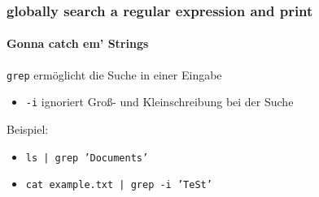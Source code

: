\documentclass[12pt,utf8]{beamer}
\begin{document}
\begin{frame}
	\frametitle{globally search a regular expression and print}
	\framesubtitle{Gonna catch em' Strings}
	\texttt{grep} ermöglicht die Suche in einer Eingabe
	\begin{itemize}
		\item \texttt{-i} ignoriert Groß- und Kleinschreibung bei der Suche
	\end{itemize}
	Beispiel:
	\begin{itemize}
		\item \texttt{ls | grep 'Documents'}
		\item \texttt{cat example.txt | grep -i 'TeSt'}
	\end{itemize}
\end{frame}

%				
%					
\end{document}
